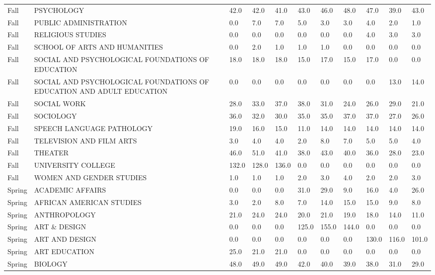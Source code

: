 \documentclass{article}
\begin{document}
\begin{longtable}[]{|l|p{4cm}|p{0.8cm}|p{0.8cm}|p{0.8cm}|p{0.8cm}|p{0.8cm}|p{0.8cm}|p{0.8cm}|p{0.8cm}|p{0.8cm}|}
Fall & PSYCHOLOGY & 42.0 & 42.0 & 41.0 & 43.0 & 46.0 & 48.0 & 47.0 &
39.0 & 43.0 \\
Fall & PUBLIC ADMINISTRATION & 0.0 & 7.0 & 7.0 & 5.0 & 3.0 & 3.0 & 4.0 &
2.0 & 1.0 \\
Fall & RELIGIOUS STUDIES & 0.0 & 0.0 & 0.0 & 0.0 & 0.0 & 0.0 & 4.0 & 3.0
& 3.0 \\
Fall & SCHOOL OF ARTS AND HUMANITIES & 0.0 & 2.0 & 1.0 & 1.0 & 1.0 & 0.0
& 0.0 & 0.0 & 0.0 \\
Fall & SOCIAL AND PSYCHOLOGICAL FOUNDATIONS OF EDUCATION & 18.0 & 18.0 &
18.0 & 15.0 & 17.0 & 15.0 & 17.0 & 0.0 & 0.0 \\
Fall & SOCIAL AND PSYCHOLOGICAL FOUNDATIONS OF EDUCATION AND ADULT
EDUCATION & 0.0 & 0.0 & 0.0 & 0.0 & 0.0 & 0.0 & 0.0 & 13.0 & 14.0 \\
Fall & SOCIAL WORK & 28.0 & 33.0 & 37.0 & 38.0 & 31.0 & 24.0 & 26.0 &
29.0 & 21.0 \\
Fall & SOCIOLOGY & 36.0 & 32.0 & 30.0 & 35.0 & 35.0 & 37.0 & 37.0 & 27.0
& 26.0 \\
Fall & SPEECH LANGUAGE PATHOLOGY & 19.0 & 16.0 & 15.0 & 11.0 & 14.0 &
14.0 & 14.0 & 14.0 & 14.0 \\
Fall & TELEVISION AND FILM ARTS & 3.0 & 4.0 & 4.0 & 2.0 & 8.0 & 7.0 &
5.0 & 5.0 & 4.0 \\
Fall & THEATER & 46.0 & 51.0 & 41.0 & 38.0 & 43.0 & 40.0 & 36.0 & 28.0 &
23.0 \\
Fall & UNIVERSITY COLLEGE & 132.0 & 128.0 & 136.0 & 0.0 & 0.0 & 0.0 &
0.0 & 0.0 & 0.0 \\
Fall & WOMEN AND GENDER STUDIES & 1.0 & 1.0 & 1.0 & 2.0 & 3.0 & 4.0 &
2.0 & 2.0 & 3.0 \\
Spring & ACADEMIC AFFAIRS & 0.0 & 0.0 & 0.0 & 31.0 & 29.0 & 9.0 & 16.0 &
4.0 & 26.0 \\
Spring & AFRICAN AMERICAN STUDIES & 3.0 & 2.0 & 8.0 & 7.0 & 14.0 & 15.0
& 15.0 & 9.0 & 8.0 \\
Spring & ANTHROPOLOGY & 21.0 & 24.0 & 24.0 & 20.0 & 21.0 & 19.0 & 18.0 &
14.0 & 11.0 \\
Spring & ART \& DESIGN & 0.0 & 0.0 & 0.0 & 125.0 & 155.0 & 144.0 & 0.0 &
0.0 & 0.0 \\
Spring & ART AND DESIGN & 0.0 & 0.0 & 0.0 & 0.0 & 0.0 & 0.0 & 130.0 &
116.0 & 101.0 \\
Spring & ART EDUCATION & 25.0 & 21.0 & 21.0 & 0.0 & 0.0 & 0.0 & 0.0 &
0.0 & 0.0 \\
Spring & BIOLOGY & 48.0 & 49.0 & 49.0 & 42.0 & 40.0 & 39.0 & 38.0 & 31.0
& 29.0 \\

\end{longtable}
\end{document}
